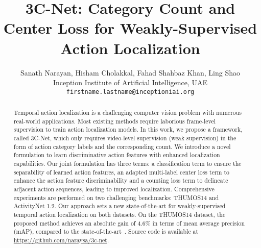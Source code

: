 \documentclass[10pt,twocolumn,letterpaper]{article}
\newcommand*{\email}[1]{\texttt{#1}}
\newcommand*{\affaddr}[1]{#1}
\begin{document}
\title{3C-Net: Category Count and Center Loss for Weakly-Supervised Action Localization}
\author{\vspace{-1cm}
Sanath Narayan, Hisham Cholakkal, Fahad Shahbaz Khan, Ling Shao \\ 
\vspace{-0.25cm}
\affaddr{Inception Institute of Artificial Intelligence, UAE}\\
\email{\small firstname.lastname@inceptioniai.org} \\
}
 
\maketitle

\begin{abstract}
   Temporal action localization is a challenging computer vision problem with numerous real-world applications. Most existing methods require laborious frame-level supervision to train action localization models. In this work, we propose a framework, called 3C-Net, which only requires video-level supervision (weak supervision) in the form of action category labels and the corresponding count. We introduce a novel formulation to learn discriminative action features with enhanced localization capabilities. Our joint formulation has three terms: a classification term to ensure the separability of learned action features, an adapted multi-label center loss term to enhance the action feature discriminability and a counting loss term to delineate adjacent action sequences, leading to improved localization. Comprehensive experiments are performed on two challenging benchmarks: THUMOS14 and ActivityNet 1.2. Our approach sets a new state-of-the-art for weakly-supervised temporal action localization on both datasets. On the THUMOS14 dataset, the proposed method achieves an absolute gain of 4.6\% in terms of mean average precision (mAP), compared to the state-of-the-art~\cite{wtalc}. Source code is available at \url{https://github.com/naraysa/3c-net}.
   \vspace{-0.2cm}
\end{abstract}
\end{document}
